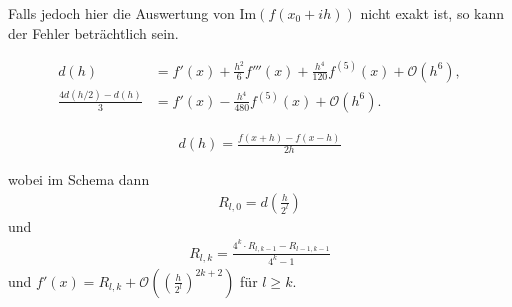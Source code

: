 Falls jedoch hier die Auswertung von $\text{Im}(f(x_0 + ih))$ nicht exakt ist, so kann der Fehler beträchtlich sein.


\begin{align*}
    d(h) &= f'(x) + \frac{h^2}{6}f'''(x) + \frac{h^4}{120}f^{(5)}(x) + \mathcal{O}(h^6), \\
    \frac{4d(h/2)-d(h)}{3} &= f'(x) - \frac{h^4}{480}f^{(5)}(x) + \mathcal{O}(h^6).
\end{align*}



\begin{align*}
    d(h) = \frac{f(x + h) - f(x - h)}{2h}
\end{align*}

wobei im Schema dann
\begin{align*}
    R_{l, 0} = d\left( \frac{h}{2^l} \right)
\end{align*}
und
\begin{align*}
    R_{l, k} = \frac{4^k \cdot R_{l, k - 1} - R_{l - 1, k - 1}}{4^k - 1}
\end{align*}
und $f'(x) = R_{l, k} + \mathcal{O}\!\left( \left( \frac{h}{2^l} \right)^{2k + 2} \right)$ für $l \geq k$.
